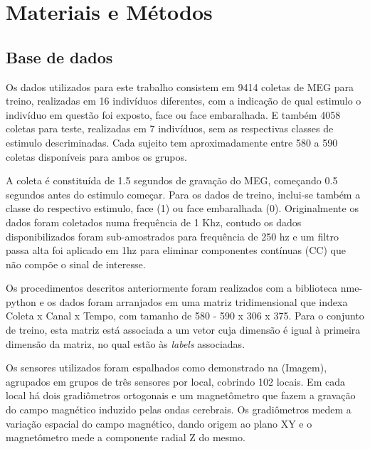 \chapter{Materiais e Métodos} \label{ch:MM} %


\section{Base de dados} 
Os dados utilizados para este trabalho consistem em 9414 coletas de MEG para treino, realizadas em 16 indivíduos diferentes, com a indicação de qual estimulo o indivíduo em questão foi exposto, face ou face embaralhada. E também 4058 coletas para teste, realizadas em 7 indivíduos, sem as respectivas classes de estimulo descriminadas. Cada sujeito tem aproximadamente entre 580 a 590 coletas disponíveis para ambos os grupos. 

A coleta é constituída de 1.5 segundos de gravação do MEG, começando 0.5 segundos antes do estimulo começar. Para os dados de treino, inclui-se também a classe do respectivo estimulo, face (1) ou face embaralhada (0). Originalmente os dados foram coletados numa frequência de 1 Khz, contudo os dados disponibilizados foram sub-amostrados para frequência  de 250 hz e um filtro passa alta foi aplicado em 1hz para eliminar componentes contínuas (CC) que não compõe o sinal de interesse.

Os procedimentos descritos anteriormente foram realizados com a biblioteca nme-python e os dados foram arranjados em uma matriz tridimensional que indexa Coleta x Canal x Tempo, com tamanho de  580 - 590 x 306 x 375. Para o conjunto de treino, esta matriz está associada a um vetor cuja dimensão é igual à primeira dimensão da matriz, no qual estão às \textit{labels} associadas.

Os sensores utilizados foram espalhados como demonstrado na (Imagem), agrupados em grupos de três sensores por local, cobrindo 102 locais. Em cada local há dois gradiômetros ortogonais e um magnetômetro que fazem a gravação do campo magnético induzido pelas ondas cerebrais. Os gradiômetros medem a variação espacial do campo magnético, dando origem ao plano XY e o magnetômetro mede a componente radial Z do mesmo.   








